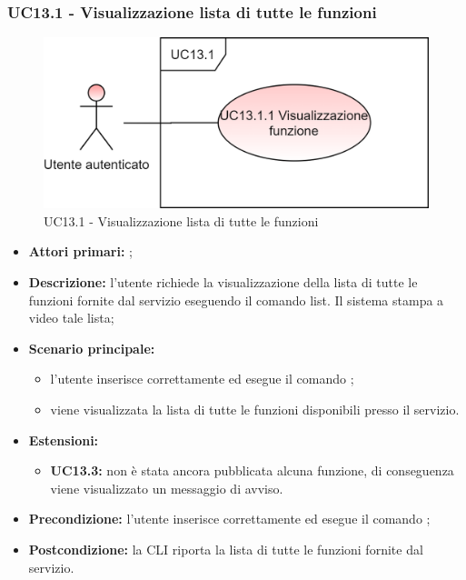 \subsubsection{UC13.1 -  Visualizzazione lista di tutte le funzioni}
\begin{figure}[H]
	\centering
	\includegraphics[scale=\ucs]{./res/img/UC13-1.png}
	\caption {UC13.1 -  Visualizzazione lista di tutte le funzioni}
\end{figure}
\begin{itemize}
	\item \textbf{Attori primari:} \ua{};
	\item \textbf{Descrizione:} l’utente richiede la visualizzazione della lista di tutte le funzioni fornite dal servizio eseguendo il comando list. Il sistema stampa a video tale lista; 
	\item \textbf{Scenario principale:} 
	\begin{itemize}
		\item l'utente inserisce correttamente ed esegue il comando \lista{}; 
		\item viene visualizzata la lista di tutte le funzioni disponibili presso il servizio.
	\end{itemize}
	\item \textbf{Estensioni:} 
	\begin{itemize}
		\item \textbf{UC13.3:} non è stata ancora pubblicata alcuna funzione, di conseguenza viene visualizzato un messaggio di avviso. 
	\end{itemize}
	\item \textbf{Precondizione:} l'utente inserisce correttamente ed esegue il comando \lista{};
	\item \textbf{Postcondizione:} la CLI riporta la lista di tutte le funzioni fornite dal servizio.
\end{itemize}